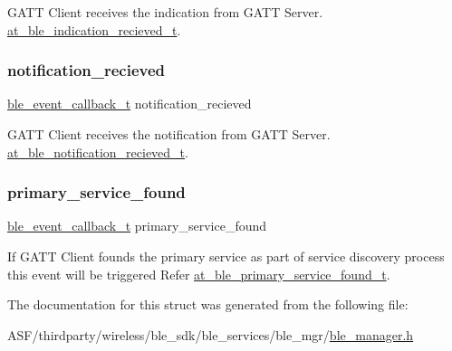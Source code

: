 G\+A\+TT Client receives the indication from G\+A\+TT Server. \mbox{\hyperlink{structat__ble__indication__recieved__t}{at\+\_\+ble\+\_\+indication\+\_\+recieved\+\_\+t}}. 

\mbox{\label{structble__gatt__client__event__cb_ab7b825b35a5ff72e4dfdc67cf4033de7}} 
\subsubsection{\texorpdfstring{notification\_recieved}{notification\_recieved}}
{\footnotesize\ttfamily \mbox{\hyperlink{ble__manager_8h_a04ce4bb8cb8282f2762e3924b1773cc9}{ble\+\_\+event\+\_\+callback\+\_\+t}} notification\+\_\+recieved}



G\+A\+TT Client receives the notification from G\+A\+TT Server. \mbox{\hyperlink{structat__ble__notification__recieved__t}{at\+\_\+ble\+\_\+notification\+\_\+recieved\+\_\+t}}. 

\mbox{\label{structble__gatt__client__event__cb_a4cfebad7f0221c03c06419f5d1b972d4}} 
\subsubsection{\texorpdfstring{primary\_service\_found}{primary\_service\_found}}
{\footnotesize\ttfamily \mbox{\hyperlink{ble__manager_8h_a04ce4bb8cb8282f2762e3924b1773cc9}{ble\+\_\+event\+\_\+callback\+\_\+t}} primary\+\_\+service\+\_\+found}



If G\+A\+TT Client founds the primary service as part of service discovery process this event will be triggered Refer \mbox{\hyperlink{structat__ble__primary__service__found__t}{at\+\_\+ble\+\_\+primary\+\_\+service\+\_\+found\+\_\+t}}. 



The documentation for this struct was generated from the following file\+:\begin{DoxyCompactItemize}
\item 
A\+S\+F/thirdparty/wireless/ble\+\_\+sdk/ble\+\_\+services/ble\+\_\+mgr/\mbox{\hyperlink{ble__manager_8h}{ble\+\_\+manager.\+h}}\end{DoxyCompactItemize}
